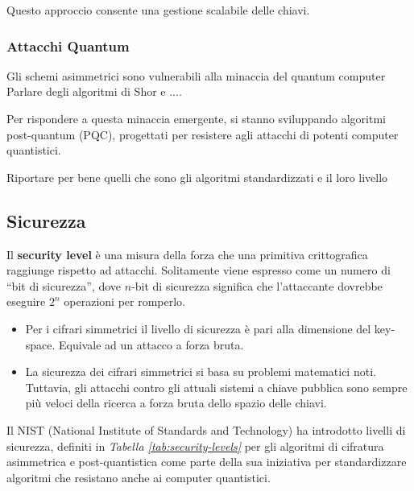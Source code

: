 \noindent
Questo approccio consente una gestione scalabile delle chiavi.

\subsubsection*{Attacchi Quantum}


Gli schemi asimmetrici sono vulnerabili alla minaccia del quantum computer
Parlare degli algoritmi di Shor e ....

Per rispondere a questa minaccia emergente, si stanno sviluppando algoritmi
post-quantum (PQC), progettati per resistere agli attacchi di potenti computer
quantistici.

Riportare per bene quelli che sono gli algoritmi standardizzati e il loro livello


\subsection{Sicurezza}


Il \textbf{security level} è una misura della forza che una primitiva crittografica raggiunge rispetto ad attacchi.
Solitamente viene espresso come un numero di “bit di sicurezza”, dove $n$-bit di sicurezza significa che l'attaccante dovrebbe eseguire $2^n$ operazioni per romperlo.
\begin{itemize}
    \item Per i cifrari simmetrici il livello di sicurezza è pari alla dimensione del key-space. Equivale ad un attacco a forza bruta.
    \item La sicurezza dei cifrari simmetrici si basa su problemi matematici noti. Tuttavia, gli attacchi contro gli attuali sistemi a chiave pubblica sono sempre più veloci della ricerca a forza bruta dello spazio delle chiavi.
\end{itemize}

\noindent
Il NIST (National Institute of Standards and Technology) ha introdotto livelli di sicurezza, definiti in \textit{Tabella \ref{tab:security-levels}} per gli algoritmi di cifratura asimmetrica e post-quantistica come parte della sua iniziativa per standardizzare algoritmi che resistano anche ai computer quantistici.

